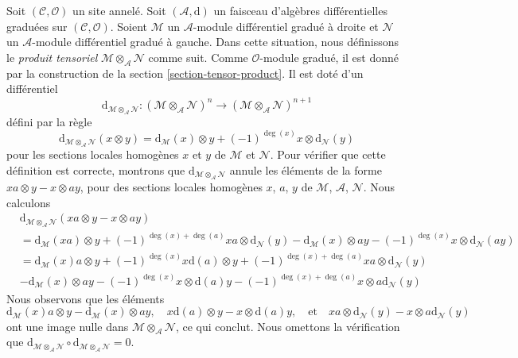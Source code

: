 \medskip\noindent
Soit $(\mathcal{C}, \mathcal{O})$ un site annelé.
Soit $(\mathcal{A}, \text{d})$ un faisceau d'algèbres différentielles graduées sur $(\mathcal{C}, \mathcal{O})$.
Soient $\mathcal{M}$ un $\mathcal{A}$-module différentiel gradué à droite et $\mathcal{N}$ un $\mathcal{A}$-module différentiel gradué à gauche.
Dans cette situation, nous définissons le {\it produit tensoriel} $\mathcal{M} \otimes_\mathcal{A} \mathcal{N}$ comme suit.
Comme $\mathcal{O}$-module gradué, il est donné par la construction de la section \ref{section-tensor-product}.
Il est doté d'un différentiel
$$
\text{d}_{\mathcal{M} \otimes_\mathcal{A} \mathcal{N}} :
(\mathcal{M} \otimes_\mathcal{A} \mathcal{N})^n
\longrightarrow
(\mathcal{M} \otimes_\mathcal{A} \mathcal{N})^{n + 1}
$$
défini par la règle
$$
\text{d}_{\mathcal{M} \otimes_\mathcal{A} \mathcal{N}}(x \otimes y) =
\text{d}_\mathcal{M}(x) \otimes y +
(-1)^{\deg(x)}x \otimes \text{d}_\mathcal{N}(y)
$$
pour les sections locales homogènes $x$ et $y$ de $\mathcal{M}$ et $\mathcal{N}$.
Pour vérifier que cette définition est correcte, montrons que $\text{d}_{\mathcal{M} \otimes_\mathcal{A} \mathcal{N}}$ annule les éléments de la forme $xa \otimes y - x \otimes ay$, pour des sections locales homogènes $x$, $a$, $y$ de $\mathcal{M}$, $\mathcal{A}$, $\mathcal{N}$.
Nous calculons
\begin{align*}
&
\text{d}_{\mathcal{M} \otimes_\mathcal{A} \mathcal{N}}(
xa \otimes y - x \otimes ay) \\
& =
\text{d}_\mathcal{M}(xa) \otimes y + (-1)^{\deg(x) + \deg(a)}
xa \otimes \text{d}_\mathcal{N}(y)
-\text{d}_\mathcal{M}(x) \otimes ay - (-1)^{\deg(x)}
x \otimes \text{d}_\mathcal{N}(ay) \\
& =
\text{d}_\mathcal{M}(x)a \otimes y + (-1)^{\deg(x)}x\text{d}(a) \otimes y
+ (-1)^{\deg(x) + \deg(a)} xa \otimes \text{d}_\mathcal{N}(y) \\
&
-\text{d}_\mathcal{M}(x) \otimes ay - (-1)^{\deg(x)}
x \otimes \text{d}(a)y - (-1)^{\deg(x) +
\deg(a)} x\otimes a\text{d}_\mathcal{N}(y)
\end{align*}
Nous observons que les éléments
$$
\text{d}_\mathcal{M}(x)a \otimes y - \text{d}_\mathcal{M}(x) \otimes ay,\quad
x\text{d}(a) \otimes y - x \otimes \text{d}(a)y,\quad
\text{et}\quad
xa \otimes \text{d}_\mathcal{N}(y) - x\otimes a\text{d}_\mathcal{N}(y)
$$
ont une image nulle dans $\mathcal{M} \otimes_\mathcal{A} \mathcal{N}$, ce qui conclut.
Nous omettons la vérification que $\text{d}_{\mathcal{M} \otimes_\mathcal{A} \mathcal{N}} \circ \text{d}_{\mathcal{M} \otimes_\mathcal{A} \mathcal{N}} = 0$.

